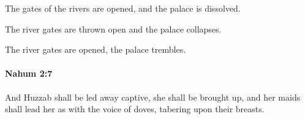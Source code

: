 			\begin{versebox}
					\item[BHS] 
					\item[LXX] 
					\item[ASV] The gates of the rivers are opened, and the palace is dissolved.
					\item[NIV] The river gates are thrown open and the palace collapses.
					\item[NRSV] The river gates are opened, the palace trembles.
			\end{versebox}

		\paragraph{Nahum 2:7} %
			\label{NAHUM-2-7}

			And Huzzab shall be led away captive, she shall be brought up, and her maids shall lead her as with the voice of doves, tabering upon their breasts.


